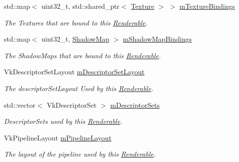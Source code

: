 \begin{DoxyCompactItemize}
std\+::map$<$ uint32\+\_\+t, std\+::shared\+\_\+ptr$<$ \mbox{\hyperlink{class_texture}{Texture}} $>$ $>$ \mbox{\hyperlink{class_renderable_a64794aa77cfcc47cac762d34ec3af309}{m\+Texture\+Bindings}}
\begin{DoxyCompactList}\small\item\em The Textures that are bound to this \mbox{\hyperlink{class_renderable}{Renderable}}. \end{DoxyCompactList}\item 
\mbox{\label{class_renderable_ad2148b83e84e8d0f47b3b7fa45632270}} 
std\+::map$<$ uint32\+\_\+t, \mbox{\hyperlink{struct_shadow_map}{Shadow\+Map}} $>$ \mbox{\hyperlink{class_renderable_ad2148b83e84e8d0f47b3b7fa45632270}{m\+Shadow\+Map\+Bindings}}
\begin{DoxyCompactList}\small\item\em The Shadow\+Maps that are bound to this \mbox{\hyperlink{class_renderable}{Renderable}}. \end{DoxyCompactList}\item 
\mbox{\label{class_renderable_a48b5e71201b6f5229b973dda4e842586}} 
Vk\+Descriptor\+Set\+Layout \mbox{\hyperlink{class_renderable_a48b5e71201b6f5229b973dda4e842586}{m\+Descriptor\+Set\+Layout}}
\begin{DoxyCompactList}\small\item\em The descriptor\+Set\+Layout Used by this \mbox{\hyperlink{class_renderable}{Renderable}}. \end{DoxyCompactList}\item 
\mbox{\label{class_renderable_af8ecd1abf5186577438cc386743d67bd}} 
std\+::vector$<$ Vk\+Descriptor\+Set $>$ \mbox{\hyperlink{class_renderable_af8ecd1abf5186577438cc386743d67bd}{m\+Descriptor\+Sets}}
\begin{DoxyCompactList}\small\item\em Descriptor\+Sets used by this \mbox{\hyperlink{class_renderable}{Renderable}}. \end{DoxyCompactList}\item 
\mbox{\label{class_renderable_a0410e149dbc2788e0896a338d105ebd0}} 
Vk\+Pipeline\+Layout \mbox{\hyperlink{class_renderable_a0410e149dbc2788e0896a338d105ebd0}{m\+Pipeline\+Layout}}
\begin{DoxyCompactList}\small\item\em The layout of the pipeline used by this \mbox{\hyperlink{class_renderable}{Renderable}}. \end{DoxyCompactList}\item 

\end{DoxyCompactItemize}
